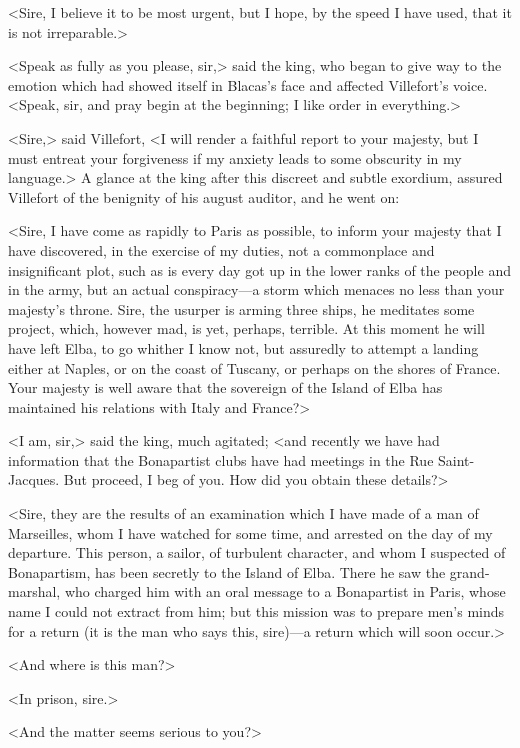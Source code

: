  <Sire, I believe it to be most urgent, but I hope, by the speed I have used, that it is not irreparable.> 

 <Speak as fully as you please, sir,> said the king, who began to give way to the emotion which had showed itself in Blacas's face and affected Villefort's voice. <Speak, sir, and pray begin at the beginning; I like order in everything.> 

 <Sire,> said Villefort, <I will render a faithful report to your majesty, but I must entreat your forgiveness if my anxiety leads to some obscurity in my language.> A glance at the king after this discreet and subtle exordium, assured Villefort of the benignity of his august auditor, and he went on: 

 <Sire, I have come as rapidly to Paris as possible, to inform your majesty that I have discovered, in the exercise of my duties, not a commonplace and insignificant plot, such as is every day got up in the lower ranks of the people and in the army, but an actual conspiracy—a storm which menaces no less than your majesty's throne. Sire, the usurper is arming three ships, he meditates some project, which, however mad, is yet, perhaps, terrible. At this moment he will have left Elba, to go whither I know not, but assuredly to attempt a landing either at Naples, or on the coast of Tuscany, or perhaps on the shores of France. Your majesty is well aware that the sovereign of the Island of Elba has maintained his relations with Italy and France?> 

 <I am, sir,> said the king, much agitated; <and recently we have had information that the Bonapartist clubs have had meetings in the Rue Saint-Jacques. But proceed, I beg of you. How did you obtain these details?> 

 <Sire, they are the results of an examination which I have made of a man of Marseilles, whom I have watched for some time, and arrested on the day of my departure. This person, a sailor, of turbulent character, and whom I suspected of Bonapartism, has been secretly to the Island of Elba. There he saw the grand-marshal, who charged him with an oral message to a Bonapartist in Paris, whose name I could not extract from him; but this mission was to prepare men's minds for a return (it is the man who says this, sire)—a return which will soon occur.> 

 <And where is this man?> 

 <In prison, sire.> 

 <And the matter seems serious to you?> 

